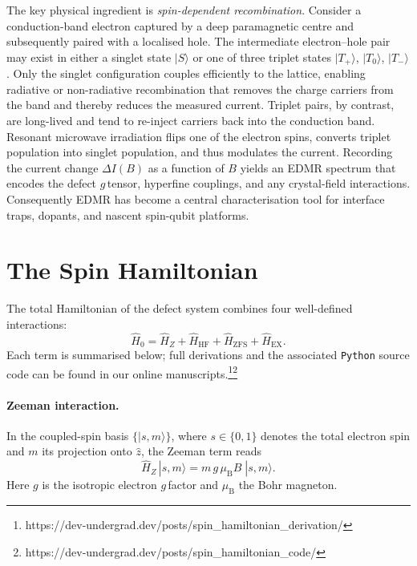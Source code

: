 \documentclass[svgnames]{article}
\begin{document}
The key physical ingredient is \emph{spin\hyp{}dependent recombination}. Consider a \mbox{conduction\hyp{}band} electron captured by a deep paramagnetic centre and subsequently paired with a localised hole. The intermediate electron–hole pair may exist in either a singlet state $|S\rangle$ or one of three triplet states $|T_{+}\rangle$, $|T_{0}\rangle$, $|T_{-}\rangle$. Only the singlet configuration couples efficiently to the lattice, enabling radiative or \mbox{non\hyp{}radiative} recombination that removes the charge carriers from the band and thereby reduces the measured current. Triplet pairs, by contrast, are long\hyp{}lived and tend to re\hyp{}inject carriers back into the conduction band. Resonant microwave irradiation flips one of the electron spins, converts triplet population into singlet population, and thus modulates the current. Recording the current change $\Delta I(B)$ as a function of $B$ yields an EDMR spectrum that encodes the defect $g$\,\textendash{}tensor, hyperfine couplings, and any \mbox{crystal\hyp{}field} interactions. Consequently EDMR has become a central characterisation tool for interface traps, dopants, and nascent \mbox{spin\hyp{}qubit} platforms.

\section{The Spin Hamiltonian}\label{sec:spin_ham}
The total Hamiltonian of the defect system combines four well\hyp{}defined interactions:
\[
  \hat{H}_0 = \hat{H}_{Z} + \hat{H}_{\mathrm{HF}} + \hat{H}_{\mathrm{ZFS}} + \hat{H}_{\mathrm{EX}}.
\]
Each term is summarised below; full derivations and the associated \verb|Python| source code can be found in our online manuscripts.\footnote{https://dev-undergrad.dev/posts/spin\_hamiltonian\_derivation/}\footnote{https://dev-undergrad.dev/posts/spin\_hamiltonian\_code/}

\paragraph{Zeeman interaction.} In the coupled\hyp{}spin basis $\{|s,m\rangle\}$, where $s\in\{0,1\}$ denotes the total electron spin and $m$ its projection onto $\hat{z}$, the Zeeman term reads
\[
  \hat{H}_{Z}\,|s,m\rangle = m\,g\,\mu_{\mathrm B} B\;|s,m\rangle.
\]
Here $g$ is the isotropic electron $g$\,\textendash{}factor and $\mu_{\mathrm B}$ the Bohr magneton.
\end{document}
